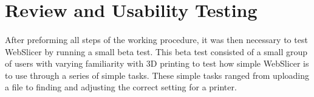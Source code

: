 \section{Review and Usability Testing}
\paragraph{}
After preforming all steps of the working procedure, it was then necessary to test WebSlicer by running a small beta test. 
This beta test consisted of a small group of users with varying familiarity with 3D printing to test how simple WebSlicer is to use through a series of simple tasks.
These simple tasks ranged from uploading a file to finding and adjusting the correct setting for a printer.
